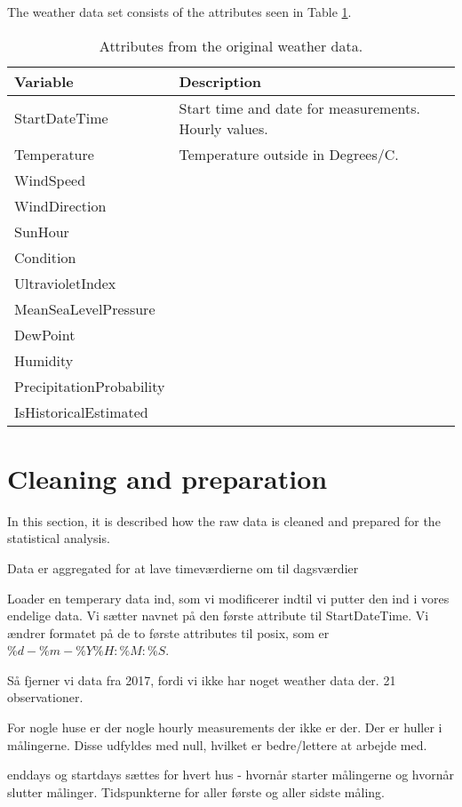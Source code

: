 The weather data set consists of the attributes seen in Table \ref{tab: weatherdata}.
\begin{table}[H]
    \centering
    \begin{tabular}{ll}
     \hline
     \textbf{Variable} & \textbf{Description} \\
    \hline
    \hline
    StartDateTime  &  Start time and date for measurements. Hourly values.\\
    Temperature  &  Temperature outside in Degrees/C. \\
    WindSpeed  &  \\
    WindDirection  &  \\
    SunHour  &  \\
    Condition  & \\
    UltravioletIndex  &   \\
    MeanSeaLevelPressure  & \\
    DewPoint  &  \\
    Humidity  &  \\
    PrecipitationProbability & \\
    IsHistoricalEstimated & \\
    \hline
    \end{tabular}
    \caption{Attributes from the original weather data.}
    \label{tab: weatherdata}
\end{table}   


\section{Cleaning and preparation}
In this section, it is described how the raw data is cleaned and prepared for the statistical analysis. 

Data er aggregated for at lave timeværdierne om til dagsværdier

Loader en temperary data ind, som vi modificerer indtil vi putter den ind i vores endelige data. 
Vi sætter navnet på den første attribute til StartDateTime. Vi ændrer formatet på de to første attributes til posix, som er $\%d-\%m-\%Y \%H:\%M:\%S$.

Så fjerner vi data fra 2017, fordi vi ikke har noget weather data der. 21 observationer. 

For nogle huse er der nogle hourly measurements der ikke er der. Der er huller i målingerne. Disse udfyldes med null, hvilket er bedre/lettere at arbejde med. 

enddays og startdays sættes for hvert hus - hvornår starter målingerne og hvornår slutter målinger. Tidspunkterne for aller første og aller sidste måling. 

